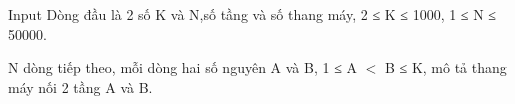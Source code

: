 Input
Dòng đầu là 2 số K và N,số tầng và số thang máy, 2 ≤ K ≤ 1000, 1 ≤ N ≤ 50000.  

   N dòng tiếp theo, mỗi dòng hai số nguyên A và B,  1 ≤ A $<$ B ≤ K, mô tả thang máy nối 2 tầng A và B.